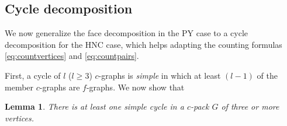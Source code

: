 \documentclass[notitlepage,preprint]{revtex4-1}
\newtheorem{lemm}[thrm]{Lemma}
\begin{document}
\subsection*{Cycle decomposition}



We now generalize the face decomposition in the PY case
  to a cycle decomposition for the HNC case,
  which helps adapting the counting formulas
  \eqref{eq:countvertices} and \eqref{eq:countpairs}.


First, a cycle of $l$ ($l \ge 3$) $c$-graphs
  is \emph{simple}
  in which at least $(l-1)$ of the member $c$-graphs are $f$-graphs.
%
We now show that
%
%
%
\begin{lemm}
There is at least one simple cycle
  in a $c$-pack $G$ of three or more vertices.
\end{lemm}
%
%
%
\end{document}

